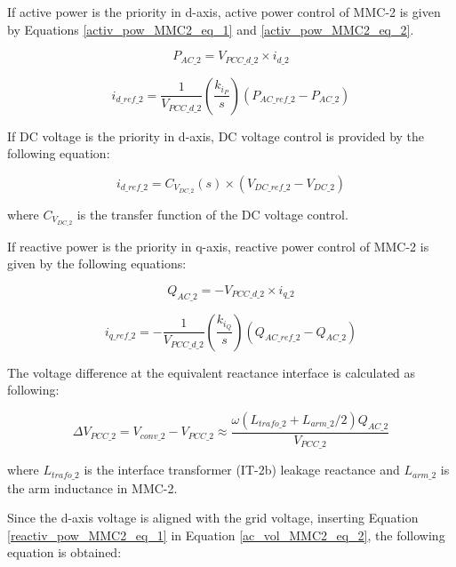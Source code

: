 If active power is the priority in d-axis, active power control of \gls{MMC}-2 is given by Equations \ref{activ_pow_MMC2_eq_1} and \ref{activ_pow_MMC2_eq_2}.

\begin{equation}\label{activ_pow_MMC2_eq_1}
    P_{AC\_2} = V_{PCC\_d\_2} \times i_{d\_2}
\end{equation}

\begin{equation}\label{activ_pow_MMC2_eq_2}
    i_{d\_ref\_2} =  \frac{1}{V_{PCC\_d\_2}} \left(\frac{k_{i_P}}{s}\right)\left(P_{AC\_ref\_2}-P_{AC\_2}\right)
\end{equation}

If \gls{DC} voltage is the priority in d-axis, \gls{DC} voltage control is provided by the following equation:

\begin{equation}
    i_{d\_ref\_2} = C_{V_{DC\_2}}\left(s\right) \times \left(V_{DC\_ref\_2} - V_{DC\_2}\right)
\end{equation}

where $C_{V_{DC\_2}}$ is the transfer function of the \gls{DC} voltage control.

If reactive power is the priority in q-axis, reactive power control of \gls{MMC}-2 is given by the following equations:

\begin{equation}\label{reactiv_pow_MMC2_eq_1}
    Q_{AC\_2} = -V_{PCC\_d\_2} \times i_{q\_2}
\end{equation}

\begin{equation}\label{reactiv_pow_MMC2_eq_2}
    i_{q\_ref\_2} = -  \frac{1}{V_{PCC\_d\_2}} \left(\frac{k_{i_Q}}{s}\right)\left(Q_{AC\_ref\_2}-Q_{AC\_2}\right)
\end{equation}

The voltage difference at the equivalent reactance interface is calculated as following:

\begin{equation}\label{ac_vol_MMC2_eq_2}
    \Delta V_{PCC\_2} = V_{conv\_2} - V_{PCC\_2} \approx \frac{\omega(L_{trafo\_2}+L_{arm\_2}/2)Q_{AC\_2}}{V_{PCC\_2}}
\end{equation}

where $L_{trafo\_2}$ is the interface transformer (IT-2b) leakage reactance and $L_{arm\_2}$ is the arm inductance in \gls{MMC}-2.

Since the d-axis voltage is aligned with the grid voltage, inserting Equation \ref{reactiv_pow_MMC2_eq_1} in Equation \ref{ac_vol_MMC2_eq_2}, the following equation is obtained:

